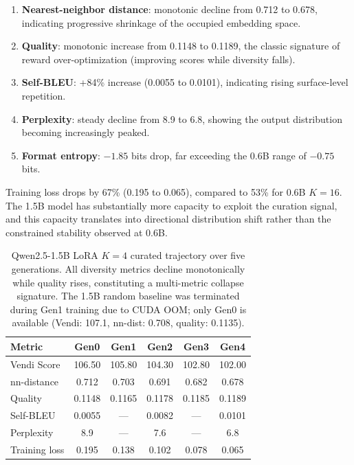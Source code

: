 \documentclass[11pt,a4paper]{article}
\begin{document}
\begin{enumerate}
    \item \textbf{Nearest-neighbor distance}: monotonic decline from 0.712 to 0.678, indicating progressive shrinkage of the occupied embedding space.
    \item \textbf{Quality}: monotonic increase from 0.1148 to 0.1189, the classic signature of reward over-optimization (improving scores while diversity falls).
    \item \textbf{Self-BLEU}: +84\% increase (0.0055 to 0.0101), indicating rising surface-level repetition.
    \item \textbf{Perplexity}: steady decline from 8.9 to 6.8, showing the output distribution becoming increasingly peaked.
    \item \textbf{Format entropy}: $-1.85$ bits drop, far exceeding the 0.6B range of $-0.75$ bits.
\end{enumerate}

Training loss drops by 67\% (0.195 to 0.065), compared to 53\% for 0.6B $K{=}16$. The 1.5B model has substantially more capacity to exploit the curation signal, and this capacity translates into directional distribution shift rather than the constrained stability observed at 0.6B.

\begin{table}[t]
\centering
\caption{Qwen2.5-1.5B LoRA $K{=}4$ curated trajectory over five generations. All diversity metrics decline monotonically while quality rises, constituting a multi-metric collapse signature. The 1.5B random baseline was terminated during Gen1 training due to CUDA OOM; only Gen0 is available (Vendi: 107.1, nn-dist: 0.708, quality: 0.1135).}
\label{tab:1.5b}
\small
\begin{tabular}{@{}lccccc@{}}
\toprule
Metric & Gen0 & Gen1 & Gen2 & Gen3 & Gen4 \\
\midrule
Vendi Score & 106.50 & 105.80 & 104.30 & 102.80 & 102.00 \\
nn-distance & 0.712 & 0.703 & 0.691 & 0.682 & 0.678 \\
Quality & 0.1148 & 0.1165 & 0.1178 & 0.1185 & 0.1189 \\
Self-BLEU & 0.0055 & --- & 0.0082 & --- & 0.0101 \\
Perplexity & 8.9 & --- & 7.6 & --- & 6.8 \\
Training loss & 0.195 & 0.138 & 0.102 & 0.078 & 0.065 \\
\bottomrule
\end{tabular}
\end{table}
\end{document}

